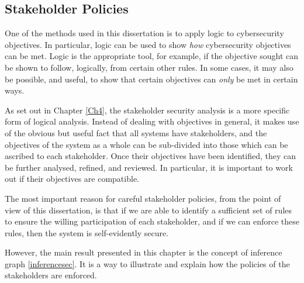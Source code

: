 \subsection{Stakeholder Policies}
One of the methods used in this dissertation is to apply logic to cybersecurity objectives. In particular, logic can be used to show {\em how} cybersecurity objectives can be met. Logic is the appropriate tool, for example, if the objective sought can be shown to follow, logically, from certain other rules. In some cases, it may also be possible, and useful, to show that certain objectives can {\em only} be met in certain ways.

As set out in Chapter \ref{Ch4}, the stakeholder security analysis is a more specific form of logical analysis. Instead of dealing with objectives in general, it makes use of the obvious but useful fact that all systems have stakeholders, and the objectives of the system as a whole can be sub-divided into those which can be ascribed to each stakeholder. Once their objectives have been identified, they can be further analysed, refined, and reviewed. In particular, it is important to work out if their objectives are compatible.

The most important reason for careful stakeholder policies, from the point of view of this dissertation, is that if we are able to identify a sufficient set of rules to ensure the willing participation of each stakeholder, and if we can enforce these rules, then the system is self-evidently secure.

However, the main result presented in this chapter is the concept of inference graph \ref{inferencesec}. It is a way to illustrate and explain how the policies of the stakeholders are enforced. 

